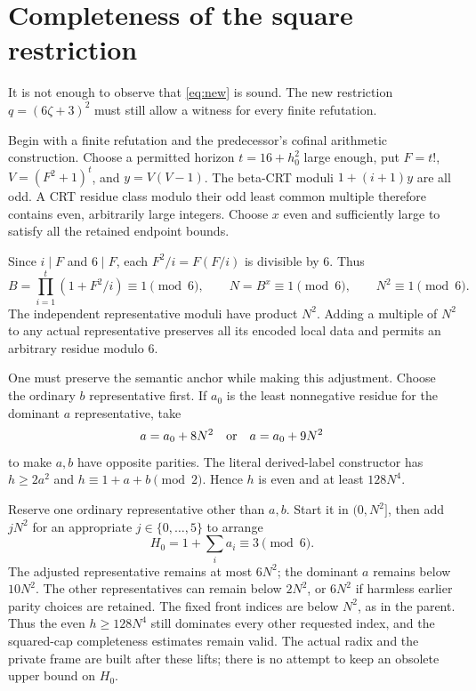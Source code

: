 \documentclass[11pt,letterpaper]{article}
\begin{document}
\section{Completeness of the square restriction}
\label{sec:complete}

It is not enough to observe that \eqref{eq:new} is sound. The new
restriction $q=(6\zeta+3)^2$ must still allow a witness for every
finite refutation.

Begin with a finite refutation and the predecessor's cofinal arithmetic
construction. Choose a permitted horizon $t=16+h_0^2$ large enough,
put $F=t!$, $V=(F^2+1)^t$, and $y=V(V-1)$. The beta-CRT
moduli $1+(i+1)y$ are all odd. A CRT residue class modulo their
odd least common multiple therefore contains even, arbitrarily large
integers. Choose $x$ even and sufficiently large to satisfy all the
retained endpoint bounds.

Since $i\mid F$ and $6\mid F$, each $F^2/i=F(F/i)$ is divisible
by $6$. Thus
\begin{equation}\label{eq:modsix}
 B=\prod_{i=1}^{t}(1+F^2/i)\equiv1\pmod6,\qquad
 N=B^x\equiv1\pmod6,\qquad N^2\equiv1\pmod6.
\end{equation}
The independent representative moduli have product $N^2$.
Adding a multiple of $N^2$ to any actual representative preserves
all its encoded local data and permits an arbitrary residue modulo $6$.

One must preserve the semantic anchor while making this adjustment.
Choose the ordinary $b$ representative first. If $a_0$ is the least
nonnegative residue for the dominant $a$ representative, take
\[
 a=a_0+8N^2\quad\hbox{or}\quad a=a_0+9N^2
\]
to make $a,b$ have opposite parities. The literal derived-label
constructor has $h\ge2a^2$ and $h\equiv1+a+b\pmod2$.
Hence $h$ is even and at least $128N^4$.

Reserve one ordinary representative other than $a,b$. Start it in
$(0,N^2]$, then add $jN^2$ for an appropriate
$j\in\{0,\ldots,5\}$ to arrange
\begin{equation}\label{eq:Hthree}
 H_0=1+\sum_i a_i\equiv3\pmod6.
\end{equation}
The adjusted representative remains at most $6N^2$; the dominant
$a$ remains below $10N^2$. The other representatives can remain
below $2N^2$, or $6N^2$ if harmless earlier parity choices are
retained. The fixed front indices are below $N^2$, as in the parent.
Thus the even $h\ge128N^4$ still dominates every other requested
index, and the squared-cap completeness estimates remain valid.
The actual radix and the private frame are built after these lifts;
there is no attempt to keep an obsolete upper bound on $H_0$.
\end{document}
